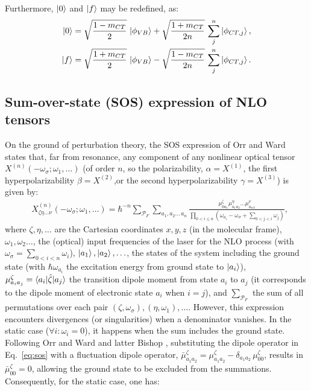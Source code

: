 \documentclass[journal=jpcafh]{achemso}
\begin{document}
Furthermore, $\ket{0}$ and $\ket{f}$ may be redefined, as:\begin{align}
\ket{0} &= \sqrt{\frac{1-m_{CT}}{2}}\,\ket{\phi_{VB}} + \sqrt{\frac{1+m_{CT}}{2n}}\,\sum_j^n \ket{\phi_{CT,j}},\nonumber\\
\ket{f} &= \sqrt{\frac{1+m_{CT}}{2}}\,\ket{\phi_{VB}} - \sqrt{\frac{1-m_{CT}}{2n}}\,\sum_j^n \ket{\phi_{CT,j}}.
\end{align}

\clearpage

\subsection{Sum-over-state (SOS) expression of NLO tensors}

On the ground of perturbation theory, 
the SOS expression of Orr and Ward \cite{orrPerturbationTheoryNonlinear1971} states that, far from resonance, any component of any nonlinear optical tensor $X^{(n)}(-\omega_\sigma;\omega_1,\ldots)$ (of order $n$, so the polarizability, $\alpha = X^{(1)}$, the first hyperpolarizability $\beta = X^{(2)}$,or the second hyperpolarizability $\gamma = X^{(3)}$) is given by:\begin{align}
	&X^{(n)}_{\zeta\eta\ldots\nu}(-\omega_\sigma;\omega_1,\ldots) = \hbar^{-n}\sum_{\mathcal{P}_F}\sum_{a_1,a_2\ldots\,a_{n}} \frac{\mu^\zeta_{0a_1}{\mu}^\eta_{a_1a_2}\ldots \mu^\nu_{a_{n\,0}}}{\prod_{0<i\leq n} (\omega_{a_i}-\omega_\sigma+\sum_{0<j<i} \omega_j)},\label{eq:sos}
\end{align}
where $\zeta,\eta,\ldots$ are the Cartesian coordinates $x, y, z$ (in the molecular frame), $\omega_1, \omega_2\ldots$, the (optical) input frequencies of the laser for the NLO process (with $\omega_\sigma = \sum_{0<i<n} \omega_i$), $\ket{a_1}, \ket{a_2}, \ldots$, the states of the system  including the ground state (with $\hbar\omega_{a_i}$ the excitation energy from ground state to $\ket{a_i}$), $\mu^\zeta_{a_ia_j} = \braket{a_i|\hat \zeta|a_j}$ the transition dipole moment from state $a_i$ to $a_j$ (it corresponds to the dipole moment of electronic state $a_i$ when $i=j$), and $\sum_{\mathcal{P}_F}$ the sum of all permutations over each pair $(\zeta, \omega_\sigma),(\eta,\omega_1),\ldots$.  However, this expression encounters divergences (or singularities) when a denominator vanishes. In the static case ($\forall i: \omega_i = 0$), it happens when the sum includes the ground state. Following Orr and Ward \cite{orrPerturbationTheoryNonlinear1971} and latter Bishop \cite{bishopExplicitNondivergentFormulas1994}, substituting the dipole operator in Eq.~\eqref{eq:sos} with a fluctuation dipole operator, $\bar{\mu}^\zeta_{a_1 a_2} = \mu^\zeta_{a_1 a_2} - \delta_{a_1 a_2}\, \mu_{00}^\zeta$, results in $\bar{\mu}^\zeta_{00} = 0$, allowing the ground state to be excluded from the summations. Consequently, for the static case, one has:
\end{document}
